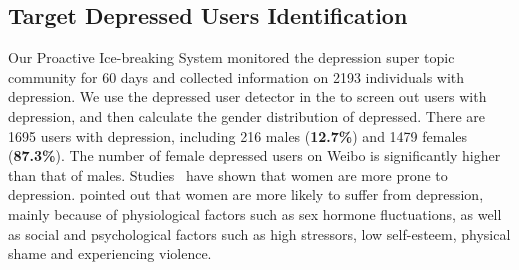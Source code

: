 
\subsection{Target Depressed Users Identification}
Our Proactive Ice-breaking System monitored the depression super topic community for 60 days and collected information on 2193 individuals with depression.
We use the depressed user detector in the  to screen out users with depression, and then calculate the gender distribution of depressed.
There are 1695 users with depression, including 216 males (\textbf{12.7\%}) and 1479 females (\textbf{87.3\%}). The number of female depressed users on Weibo is significantly higher than that of males. Studies~\cite{ahmed2023chatbot} have shown that women are more prone to depression. \citet{kuehner2017depression,lu2021prevalence} pointed out that women are more likely to suffer from depression, mainly because of physiological factors such as sex hormone fluctuations, as well as social and psychological factors such as high stressors, low self-esteem, physical shame and experiencing violence.

